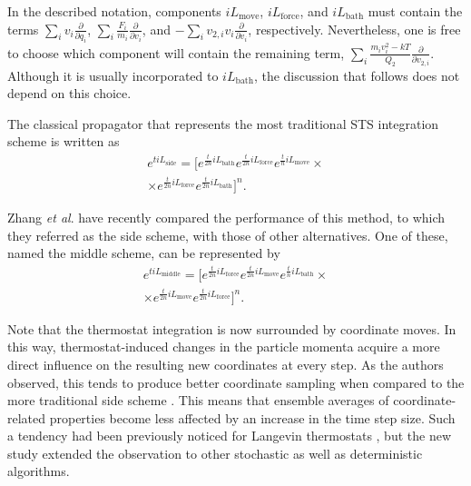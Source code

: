 \documentclass[
    journal=jctcce,
    layout=twocolumn
]{achemso}
\newcommand{\diff}[2]{\frac{\partial #2}{\partial #1}} %
\newcommand{\dof}{i}   %
\newcommand{\Liu}{i\!L}
\begin{document}
In the described notation, components $\Liu_\mathrm{move}$, $\Liu_\mathrm{force}$, and $\Liu_\mathrm{bath}$ must contain the terms $\sum_\dof v_\dof \diff{q_\dof}{}$, $\sum_\dof \frac{F_\dof}{m_\dof} \diff{v_\dof}{}$, and $-\sum_\dof v_{2,\dof} v_\dof \diff{v_\dof}{}$, respectively.
Nevertheless, one is free to choose which component will contain the remaining term, $\sum_\dof \frac{m_\dof v_\dof^2 - kT}{Q_2} \diff{v_{2,\dof}}{}$.
Although it is usually incorporated to $\Liu_\mathrm{bath}$, the discussion that follows does not depend on this choice.

The classical propagator that represents the most traditional STS integration scheme is written as
\begin{multline}
\label{eq:STS side scheme propagator}
e^{t \Liu_\mathrm{side}} = \Big[
e^{\frac{t}{2n} \Liu_\mathrm{bath}}
e^{\frac{t}{2n} \Liu_\mathrm{force}}
e^{\frac{t}{n} \Liu_\mathrm{move}} \times \\
\times e^{\frac{t}{2n} \Liu_\mathrm{force}}
e^{\frac{t}{2n} \Liu_\mathrm{bath}}
\Big]^{n}.
\end{multline}

Zhang \textit{et al}. \cite{Zhang_2017} have recently compared the performance of this method, to which they referred as the side scheme, with those of other alternatives.
One of these, named the middle scheme, can be represented by
\begin{multline}
\label{eq:STS middle scheme propagator}
e^{t \Liu_\mathrm{middle}} = \Big[
e^{\frac{t}{2n} \Liu_\mathrm{force}}
e^{\frac{t}{2n} \Liu_\mathrm{move}}
e^{\frac{t}{n} \Liu_\mathrm{bath}} \times \\
\times e^{\frac{t}{2n} \Liu_\mathrm{move}}
e^{\frac{t}{2n} \Liu_\mathrm{force}}
\Big]^{n}.
\end{multline}

Note that the thermostat integration is now surrounded by coordinate moves.
In this way, thermostat-induced changes in the particle momenta acquire a more direct influence on the resulting new coordinates at every step.
As the authors observed, this tends to produce better coordinate sampling when compared to the more traditional side scheme \cite{Zhang_2017}.
This means that ensemble averages of coordinate-related properties become less affected by an increase in the time step size.
Such a tendency had been previously noticed for Langevin thermostats \cite{Leimkuhler_2012, Leimkuhler_2013_2}, but the new study extended the observation to other stochastic as well as deterministic algorithms.
\end{document}
